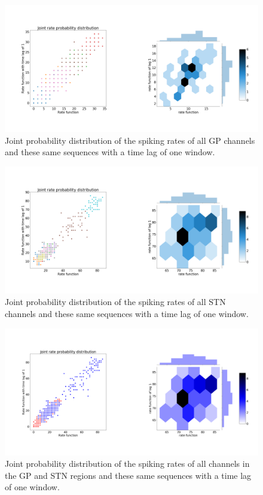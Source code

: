 \documentclass{kththesis}
\begin{document}
\begin{figure}[H]
    \centering
    \centerline{\includegraphics[width=1\textwidth]{images/spiking/JP_gp.png}}
    \caption{Joint probability distribution of the spiking rates of all GP channels and these same sequences with a time lag of one window. }
    \label{fig:JP1}
\end{figure}

\begin{figure}[H]
    \centering
    \centerline{\includegraphics[width=1\textwidth]{images/spiking/JP_stn.png}}
    \caption{Joint probability distribution of the spiking rates of all STN channels and these same sequences with a time lag of one window.}
    \label{fig:JP2}
\end{figure}

\begin{figure}[H]
    \centering
    \centerline{\includegraphics[width=1\textwidth]{images/spiking/JP_all.png}}
    \caption{Joint probability distribution of the spiking rates of all channels in the GP and STN regions and these same sequences with a time lag of one window.}
    \label{fig:JP3}
\end{figure}
\end{document}
